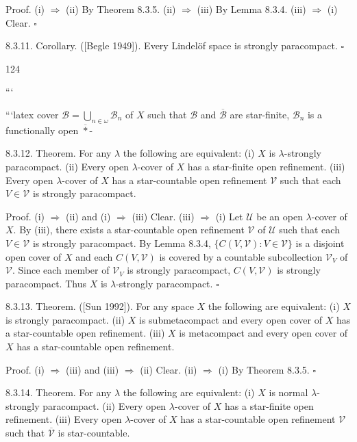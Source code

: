 \documentclass[jiang8iv.tex]{subfiles}
\begin{document}
Proof. (i) \(\Rightarrow\) (ii) By Theorem 8.3.5.
(ii) \(\Rightarrow\) (iii) By Lemma 8.3.4.
(iii) \(\Rightarrow\) (i) Clear. \(\square\)

8.3.11. Corollary. ([Begle 1949]). Every Lindelöf space is strongly paracompact. \(\square\)

124

```

```latex
cover \(\mathscr{B}=\bigcup_{n\in\omega}\mathscr{B}_n\) of \(X\) such that \(\mathscr{B}\) and \(\overline{\mathscr{B}}\) are star-finite, \(\mathscr{B}_n\) is a functionally open \(\overline{*}\)-

8.3.12. Theorem. For any \(\lambda\) the following are equivalent:
(i) \(X\) is \(\lambda\)-strongly paracompact.
(ii) Every open \(\lambda\)-cover of \(X\) has a star-finite open refinement.
(iii) Every open \(\lambda\)-cover of \(X\) has a star-countable open refinement \(\mathscr{V}\) such that each \(V\in\mathscr{V}\) is strongly paracompact.

Proof. (i) \(\Rightarrow\) (ii) and (i) \(\Rightarrow\) (iii) Clear.
(iii) \(\Rightarrow\) (i) Let \(\mathscr{U}\) be an open \(\lambda\)-cover of \(X\). By (iii), there exists a star-countable open refinement \(\mathscr{V}\) of \(\mathscr{U}\) such that each \(V\in\mathscr{V}\) is strongly paracompact. By Lemma 8.3.4, \(\{C(V,\mathscr{V}): V\in\mathscr{V}\}\) is a disjoint open cover of \(X\) and each \(C(V,\mathscr{V})\) is covered by a countable subcollection \(\mathscr{V}_V\) of \(\mathscr{V}\). Since each member of \(\mathscr{V}_V\) is strongly paracompact, \(C(V,\mathscr{V})\) is strongly paracompact. Thus \(X\) is \(\lambda\)-strongly paracompact. \(\square\)

8.3.13. Theorem. ([Sun 1992]). For any space \(X\) the following are equivalent:
(i) \(X\) is strongly paracompact.
(ii) \(X\) is submetacompact and every open cover of \(X\) has a star-countable open refinement.
(iii) \(X\) is metacompact and every open cover of \(X\) has a star-countable open refinement.

Proof. (i) \(\Rightarrow\) (iii) and (iii) \(\Rightarrow\) (ii) Clear.
(ii) \(\Rightarrow\) (i) By Theorem 8.3.5. \(\square\)


8.3.14. Theorem. For any \(\lambda\) the following are equivalent:
(i) \(X\) is normal \(\lambda\)-strongly paracompact.
(ii) Every open \(\lambda\)-cover of \(X\) has a star-finite open refinement.
(iii) Every open \(\lambda\)-cover of \(X\) has a star-countable open refinement \(\mathscr{V}\) such that \(\overline{\mathscr{V}}\) is star-countable.
\end{document}
